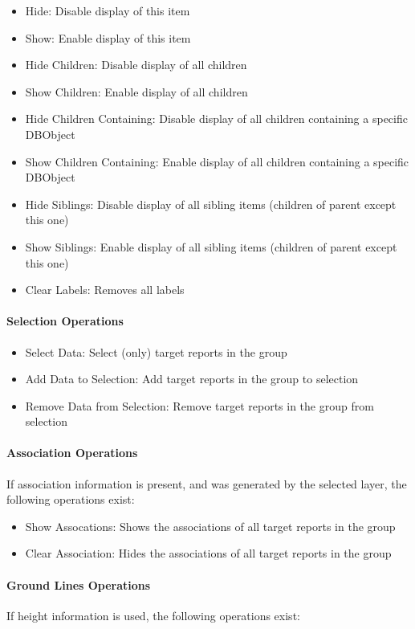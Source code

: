 \begin{itemize}
 \item Hide: Disable display of this item
 \item Show: Enable display of this item
 \item Hide Children: Disable display of all children
 \item Show Children: Enable display of all children
 \item Hide Children Containing: Disable display of all children containing a specific DBObject
 \item Show Children Containing: Enable display of all children containing a specific DBObject
 \item Hide Siblings: Disable display of all sibling items (children of parent except this one)
 \item Show Siblings: Enable display of all sibling items (children of parent except this one)
 \item Clear Labels: Removes all labels
\end{itemize}

\paragraph{Selection Operations}

\begin{itemize}
 \item Select Data: Select (only) target reports in the group
 \item Add Data to Selection: Add target reports in the group to selection
 \item Remove Data from Selection: Remove target reports in the group from selection
\end{itemize}

\paragraph{Association Operations}
If association information is present, and was generated by the selected layer, the following operations exist:

\begin{itemize}
 \item Show Assocations: Shows the associations of all target reports in the group
 \item Clear Association: Hides the associations of all target reports in the group
\end{itemize} 


\paragraph{Ground Lines Operations}
If height information is used, the following operations exist:


